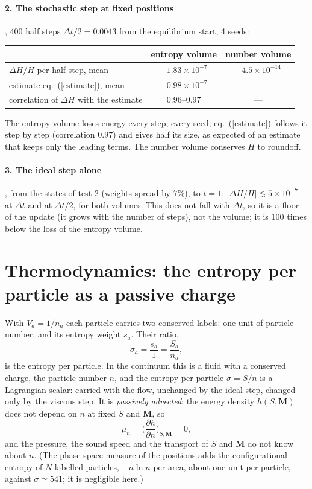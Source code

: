 \documentclass[11pt,aps,preprint,nofootinbib,superscriptaddress,tightenlines]{revtex4-2}
\def\st{\begin{equation}}
\def\stp{\end{equation}}
\def\Eq#1{eq.~(\ref{#1})}
\let\oldparagraph\paragraph
\renewcommand{\paragraph}{\par\bigskip\oldparagraph}
\begin{document}
\paragraph{2. The stochastic step at fixed positions}, 400 half steps $\Delta t/2=0.0043$
from the equilibrium start, 4 seeds:
\begin{center}
\begin{tabular}{lcc}
\hline
 & entropy volume & number volume \\ \hline
$\Delta H/H$ per half step, mean & $-1.83\times10^{-7}$ & $-4.5\times10^{-14}$ \\
estimate \Eq{estimate}, mean & $-0.98\times10^{-7}$ & --- \\
correlation of $\Delta H$ with the estimate & $0.96$--$0.97$ & --- \\
\hline
\end{tabular}
\end{center}
The entropy volume loses energy every step, every seed; \Eq{estimate} follows it step by
step (correlation $0.97$) and gives half its size, as expected of an estimate that keeps
only the leading terms.  The number volume conserves $H$ to roundoff.

\paragraph{3. The ideal step alone}, from the states of test 2 (weights spread by $7\%$),
to $t=1$: $|\Delta H/H|\lesssim5\times10^{-7}$ at $\Delta t$ and at $\Delta t/2$, for
both volumes.  This does not fall with $\Delta t$, so it is a floor of the update (it
grows with the number of steps), not the volume; it is 100 times below the loss of the
entropy volume.

\section{Thermodynamics: the entropy per particle as a passive charge}
\label{sec:thermo}

With $V_a=1/n_a$ each particle carries two conserved labels: one unit of particle number,
and its entropy weight $s_a$.  Their ratio,
\st
\sigma_a=\frac{s_a}{1}=\frac{S_a}{n_a},
\stp
is the entropy per particle.  In the continuum this is a fluid with a conserved charge,
the particle number $n$, and the entropy per particle $\sigma=S/n$ is a Lagrangian
scalar: carried with the flow, unchanged by the ideal step, changed only by the viscous
step.  It is \emph{passively advected}: the energy density $h(S,\bm M)$ does not depend
on $n$ at fixed $S$ and $\bm M$, so
\st
\mu_n=\Big(\frac{\partial h}{\partial n}\Big)_{S,\bm M}=0 ,
\stp
and the pressure, the sound speed and the transport of $S$ and $\bm M$ do not know about
$n$.  (The phase-space measure of the positions adds the configurational entropy of $N$
labelled particles, $-n\ln n$ per area, about one unit per particle, against
$\sigma\simeq541$; it is negligible here.)
\end{document}
